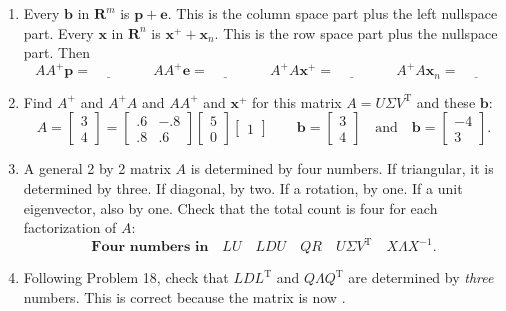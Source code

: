 \documentclass[14pt, a4paper]{article}
\begin{document}
\begin{enumerate}[resume]
    \item Every $\boldsymbol{b}$ in $\mathbf{R}^m$ is $\boldsymbol{p} + \boldsymbol{e}$. This is the column space part plus the left nullspace part. Every $\boldsymbol{x}$ in $\mathbf{R}^n$ is $\boldsymbol{x}^+ + \boldsymbol{x}_n$. This is the row space part plus the nullspace part. Then
          \[
              AA^+\boldsymbol{p} = \underline{\hspace{1cm}} \qquad AA^+\boldsymbol{e} = \underline{\hspace{1cm}} \qquad A^+A\boldsymbol{x}^+ = \underline{\hspace{1cm}} \qquad A^+A\boldsymbol{x}_n = \underline{\hspace{1cm}}
          \]

    \item Find $A^+$ and $A^+A$ and $AA^+$ and $\boldsymbol{x}^+$ for this matrix $A = U\Sigma V^{\mathrm{T}}$ and these $\boldsymbol{b}$:
          \[
              A = \begin{bmatrix} 3 \\ 4 \end{bmatrix} = \begin{bmatrix} .6 & -.8 \\ .8 & .6 \end{bmatrix} \begin{bmatrix} 5 \\ 0 \end{bmatrix} \begin{bmatrix} 1 \end{bmatrix} \qquad \boldsymbol{b} = \begin{bmatrix} 3 \\ 4 \end{bmatrix} \quad \text{and} \quad \boldsymbol{b} = \begin{bmatrix} -4 \\ 3 \end{bmatrix}.
          \]

    \item A general 2 by 2 matrix $A$ is determined by four numbers. If triangular, it is determined by three. If diagonal, by two. If a rotation, by one. If a unit eigenvector, also by one. Check that the total count is four for each factorization of $A$:
          \[
              \textbf{Four numbers in} \quad LU \quad LDU \quad QR \quad U\Sigma V^{\mathrm{T}} \quad X\Lambda X^{-1}.
          \]

    \item Following Problem 18, check that $LDL^{\mathrm{T}}$ and $Q\Lambda Q^{\mathrm{T}}$ are determined by \textit{three} numbers. This is correct because the matrix is now \underline{\hspace{1cm}}.


\end{enumerate}
\end{document}
